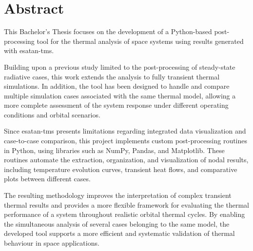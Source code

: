 \chapter{Abstract} \label{ch:chapter_01}

This Bachelor's Thesis focuses on the development of a Python-based post-processing tool for the thermal 
analysis of space systems using results generated with \acrshort{esatan-tms}.

Building upon a previous study limited to the post-processing of steady-state radiative cases, 
this work extends the analysis to fully transient thermal simulations. In addition, the tool has been 
designed to handle and compare multiple simulation cases associated with the same thermal model, allowing a more 
complete assessment of the system response under different operating conditions and orbital scenarios.

Since \acrshort{esatan-tms} presents limitations regarding integrated data visualization and case-to-case 
comparison, this project implements custom post-processing routines in Python, using libraries such as 
NumPy, Pandas, and Matplotlib. These routines automate the extraction, organization, and visualization of 
nodal results, including temperature evolution curves, transient heat flows, and comparative plots between 
different cases.

The resulting methodology improves the interpretation of complex transient thermal results and provides a 
more flexible framework for evaluating the thermal performance of a system throughout realistic orbital 
thermal cycles. By enabling the simultaneous analysis of several cases belonging to the same 
model, the developed tool supports a more efficient and systematic validation of thermal behaviour 
in space applications.

